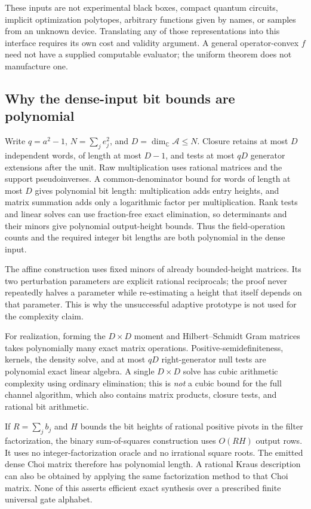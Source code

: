 \documentclass[11pt,a4paper]{article}
\theoremstyle{definition}\newtheorem{definition}[theorem]{Definition}
\newcommand{\Alg}{\mathcal A}
\newcommand{\C}{\mathbb C}
\begin{document}
These inputs are not experimental black boxes, compact quantum circuits, implicit optimization polytopes, arbitrary functions given by names, or samples from an unknown device. Translating any of those representations into this interface requires its own cost and validity argument. A general operator-convex $f$ need not have a supplied computable evaluator; the uniform theorem does not manufacture one.

\subsection{Why the dense-input bit bounds are polynomial}

Write $q=a^2-1$, $N=\sum_je_j^2$, and $D=\dim_\C\Alg\le N$. Closure retains at most $D$ independent words, of length at most $D-1$, and tests at most $qD$ generator extensions after the unit. Raw multiplication uses rational matrices and the support pseudoinverses. A common-denominator bound for words of length at most $D$ gives polynomial bit length: multiplication adds entry heights, and matrix summation adds only a logarithmic factor per multiplication. Rank tests and linear solves can use fraction-free exact elimination, so determinants and their minors give polynomial output-height bounds. Thus the field-operation counts and the required integer bit lengths are both polynomial in the dense input.

The affine construction uses fixed minors of already bounded-height matrices. Its two perturbation parameters are explicit rational reciprocals; the proof never repeatedly halves a parameter while re-estimating a height that itself depends on that parameter. This is why the unsuccessful adaptive prototype is not used for the complexity claim.

For realization, forming the $D\times D$ moment and Hilbert--Schmidt Gram matrices takes polynomially many exact matrix operations. Positive-semidefiniteness, kernels, the density solve, and at most $qD$ right-generator null tests are polynomial exact linear algebra. A single $D\times D$ solve has cubic arithmetic complexity using ordinary elimination; this is \emph{not} a cubic bound for the full channel algorithm, which also contains matrix products, closure tests, and rational bit arithmetic.

If $R=\sum_jb_j$ and $H$ bounds the bit heights of rational positive pivots in the filter factorization, the binary sum-of-squares construction uses $O(RH)$ output rows. It uses no integer-factorization oracle and no irrational square roots. The emitted dense Choi matrix therefore has polynomial length. A rational Kraus description can also be obtained by applying the same factorization method to that Choi matrix. None of this asserts efficient exact synthesis over a prescribed finite universal gate alphabet.
\end{document}
